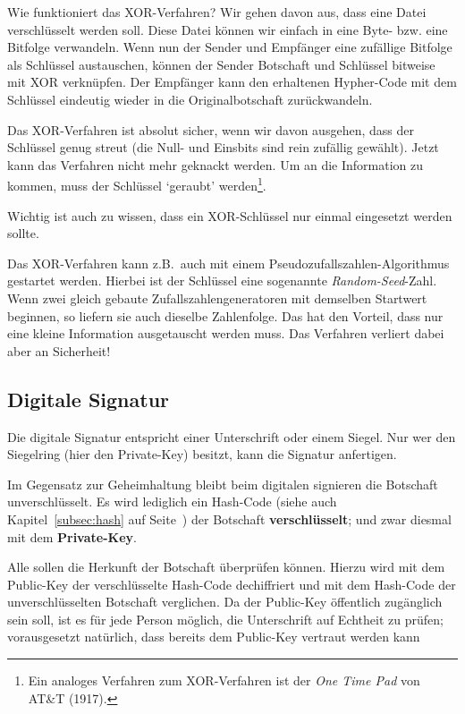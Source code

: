 Wie funktioniert das XOR-Verfahren? Wir gehen davon aus, dass eine
Datei verschlüsselt werden soll. Diese Datei können wir einfach
in eine Byte- bzw. eine Bitfolge verwandeln. Wenn nun der Sender
und Empfänger eine zufällige Bitfolge als Schlüssel austauschen,
können der Sender Botschaft und Schlüssel bitweise mit XOR verknüpfen.
Der Empfänger kann den erhaltenen Hypher-Code mit dem Schlüssel
eindeutig wieder in die Originalbotschaft zurückwandeln.

Das XOR-Verfahren ist absolut sicher, wenn wir davon ausgehen,
dass der Schlüssel genug streut (die Null- und Einsbits sind rein
zufällig gewählt). Jetzt kann das Verfahren nicht mehr geknackt
werden. Um an die Information zu kommen, muss der Schlüssel
`geraubt' werden\footnote{Ein analoges Verfahren zum XOR-Verfahren
ist der \emph{One Time Pad} von AT\&T (1917).}.

Wichtig ist auch zu wissen, dass ein XOR-Schlüssel nur einmal
eingesetzt werden sollte.

Das XOR-Verfahren kann z.B.~auch mit einem Pseudozufallszahlen-Algorithmus
gestartet werden. Hierbei ist der Schlüssel eine sogenannte
\emph{Random-Seed}-Zahl. Wenn zwei gleich gebaute Zufallszahlengeneratoren
mit demselben Startwert beginnen, so liefern sie auch dieselbe
Zahlenfolge. Das hat den Vorteil, dass nur eine kleine Information
ausgetauscht werden muss. Das Verfahren verliert dabei aber an Sicherheit!

\subsection{Digitale Signatur}
\label{subsec:digitale-signatur}

Die digitale Signatur entspricht einer Unterschrift oder einem Siegel.
Nur wer den Siegelring (hier den Private-Key) besitzt, kann die Signatur
anfertigen.

Im Gegensatz zur Geheimhaltung bleibt beim digitalen signieren die
Botschaft unverschlüsselt. Es wird lediglich ein Hash-Code
(siehe auch Kapitel~\ref{subsec:hash} auf Seite~\pageref{subsec:hash})
der Botschaft \textbf{verschlüsselt}; und zwar diesmal mit dem
\textbf{Private-Key}.

Alle sollen die Herkunft der Botschaft überprüfen können. Hierzu wird
mit dem Public-Key der verschlüsselte Hash-Code dechiffriert und mit
dem Hash-Code der unverschlüsselten Botschaft verglichen. Da der
Public-Key öffentlich zugänglich sein soll, ist es für jede Person
möglich, die Unterschrift auf Echtheit zu prüfen; vorausgesetzt
natürlich, dass bereits dem Public-Key vertraut werden kann

